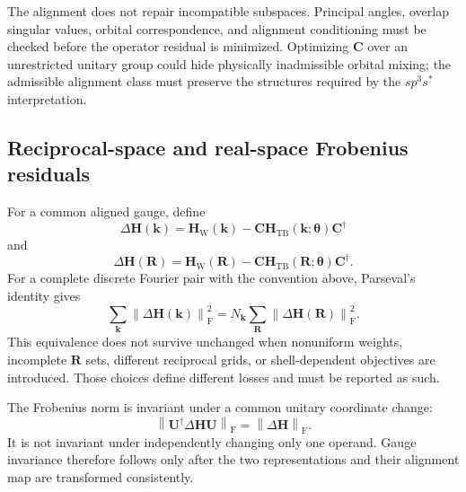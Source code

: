 The alignment does not repair incompatible subspaces. Principal angles,
overlap singular values, orbital correspondence, and alignment conditioning
must be checked before the operator residual is minimized. Optimizing
$\mathbf C$ over an unrestricted unitary group could hide physically
inadmissible orbital mixing; the admissible alignment class must preserve the
structures required by the $sp^3s^{\ast}$ interpretation.

\subsection*{Reciprocal-space and real-space Frobenius residuals}

For a common aligned gauge, define
\begin{equation}
    \Delta\mathbf H(\mathbf k)
    =
    \mathbf H_{\mathrm W}(\mathbf k)
    -
    \mathbf C
    \mathbf H_{\mathrm{TB}}(\mathbf k;\boldsymbol\theta)
    \mathbf C^\dagger
\end{equation}
and
\begin{equation}
    \Delta\mathbf H(\mathbf R)
    =
    \mathbf H_{\mathrm W}(\mathbf R)
    -
    \mathbf C
    \mathbf H_{\mathrm{TB}}(\mathbf R;\boldsymbol\theta)
    \mathbf C^\dagger.
\end{equation}
For a complete discrete Fourier pair with the convention above, Parseval's
identity gives
\begin{equation}
    \sum_{\mathbf k}
    \left\lVert
        \Delta\mathbf H(\mathbf k)
    \right\rVert_{\mathrm F}^2
    =
    N_{\mathbf k}
    \sum_{\mathbf R}
    \left\lVert
        \Delta\mathbf H(\mathbf R)
    \right\rVert_{\mathrm F}^2.
\end{equation}
This equivalence does not survive unchanged when nonuniform weights, incomplete
$\mathbf R$ sets, different reciprocal grids, or shell-dependent objectives
are introduced. Those choices define different losses and must be reported as
such.

The Frobenius norm is invariant under a common unitary coordinate change:
\begin{equation}
    \left\lVert
        \mathbf U^\dagger
        \Delta\mathbf H
        \mathbf U
    \right\rVert_{\mathrm F}
    =
    \left\lVert
        \Delta\mathbf H
    \right\rVert_{\mathrm F}.
\end{equation}
It is not invariant under independently changing only one operand. Gauge
invariance therefore follows only after the two representations and their
alignment map are transformed consistently.


